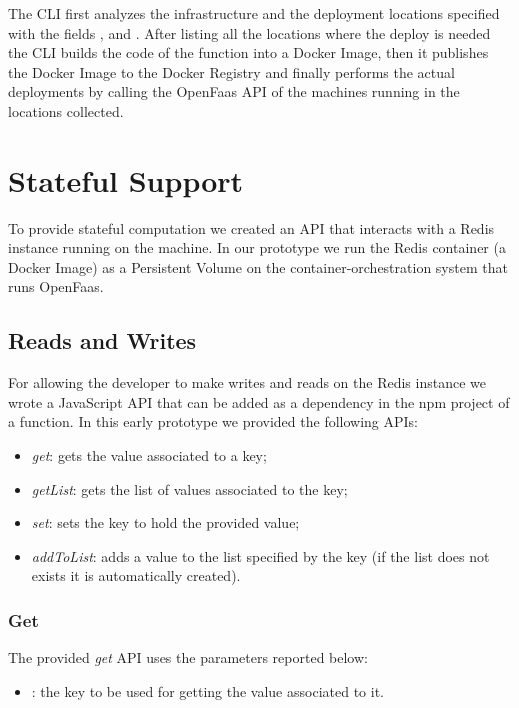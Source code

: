 The CLI first analyzes the infrastructure and the deployment locations specified with the fields ,  and . After listing all the locations where the deploy is needed the CLI builds the code of the function into a Docker Image, then it publishes the Docker Image to the Docker Registry and finally performs the actual deployments by calling the OpenFaas API of the machines running in the locations collected.


\section{Stateful Support}
To provide stateful computation we created an API that interacts with a Redis instance running on the machine.
In our prototype we run the Redis container (a Docker Image) as a Persistent Volume on the container-orchestration system that runs OpenFaas.


\subsection{Reads and Writes}

For allowing the developer to make writes and reads on the Redis instance we wrote a JavaScript API that can be added as a dependency in the npm project of a function.
In this early prototype we provided the following APIs:

\begin{itemize}
    \item \textit{get}: gets the value associated to a key;
    \item \textit{getList}: gets the list of values associated to the key;
    \item \textit{set}: sets the key to hold the provided value;
    \item \textit{addToList}: adds a value to the list specified by the key (if the list does not exists it is automatically created).
\end{itemize}


\subsubsection{Get}
The provided \textit{get} API uses the parameters reported below:

\begin{itemize}
    \item {}: the key to be used for getting the value associated to it.
\end{itemize}

